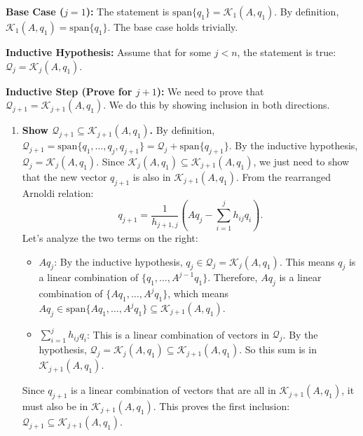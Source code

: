 \begin{solution}
\textbf{Base Case ($j=1$):}
The statement is $\mathrm{span}\{q_1\} = \mathcal{K}_1(A, q_1)$.
By definition, $\mathcal{K}_1(A, q_1) = \mathrm{span}\{q_1\}$. The base case holds trivially.

\textbf{Inductive Hypothesis:}
Assume that for some $j < n$, the statement is true: $\mathcal{Q}_j = \mathcal{K}_j(A, q_1)$.

\textbf{Inductive Step (Prove for $j+1$):}
We need to prove that $\mathcal{Q}_{j+1} = \mathcal{K}_{j+1}(A, q_1)$. We do this by showing inclusion in both directions.

\begin{enumerate}
    \item[($\subseteq$)] \textbf{Show $\mathcal{Q}_{j+1} \subseteq \mathcal{K}_{j+1}(A, q_1)$.}
    By definition, $\mathcal{Q}_{j+1} = \mathrm{span}\{q_1, \dots, q_j, q_{j+1}\} = \mathcal{Q}_j + \mathrm{span}\{q_{j+1}\}$.
    By the inductive hypothesis, $\mathcal{Q}_j = \mathcal{K}_j(A, q_1)$. Since $\mathcal{K}_j(A, q_1) \subseteq \mathcal{K}_{j+1}(A, q_1)$, we just need to show that the new vector $q_{j+1}$ is also in $\mathcal{K}_{j+1}(A, q_1)$.
    From the rearranged Arnoldi relation:
    \[ q_{j+1} = \frac{1}{h_{j+1, j}} \left( A q_j - \sum_{i=1}^j h_{ij} q_i \right). \]
    Let's analyze the two terms on the right:
    \begin{itemize}
        \item $A q_j$: By the inductive hypothesis, $q_j \in \mathcal{Q}_j = \mathcal{K}_j(A, q_1)$. This means $q_j$ is a linear combination of $\{q_1, \dots, A^{j-1}q_1\}$. Therefore, $Aq_j$ is a linear combination of $\{Aq_1, \dots, A^j q_1\}$, which means $A q_j \in \mathrm{span}\{Aq_1, \dots, A^j q_1\} \subseteq \mathcal{K}_{j+1}(A, q_1)$.
        \item $\sum_{i=1}^j h_{ij} q_i$: This is a linear combination of vectors in $\mathcal{Q}_j$. By the hypothesis, $\mathcal{Q}_j = \mathcal{K}_j(A, q_1) \subseteq \mathcal{K}_{j+1}(A, q_1)$. So this sum is in $\mathcal{K}_{j+1}(A, q_1)$.
    \end{itemize}
    Since $q_{j+1}$ is a linear combination of vectors that are all in $\mathcal{K}_{j+1}(A, q_1)$, it must also be in $\mathcal{K}_{j+1}(A, q_1)$. This proves the first inclusion: $\mathcal{Q}_{j+1} \subseteq \mathcal{K}_{j+1}(A, q_1)$.


\end{enumerate}
\end{solution}
